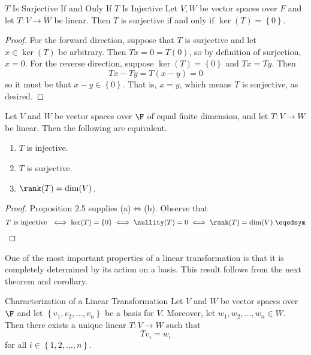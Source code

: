 \documentclass[linearalgebraI]{subfiles}
\begin{document}
    \begin{prop}{$T$ Is Surjective If and Only If $T$ Is Injective}
        Let $V, W$ be vector spaces over $F$ and let $T: V\to W$ be linear. Then $T$ is surjective if and only if $\ker(T) = \left\lbrace 0 \right\rbrace$.
    \end{prop}

    \begin{proof}
        For the forward direction, suppose that $T$ is surjective and let $x\in \ker(T)$ be arbitrary. Then $Tx = 0 = T(0)$, so by definition of surjection, $x=0$. For the reverse direction, suppose $\ker(T) = \left\lbrace 0 \right\rbrace$ and $Tx = Ty$. Then
        \begin{equation*}
            Tx - Ty = T(x-y) = 0
        \end{equation*}
        so it must be that $x-y\in \left\lbrace 0 \right\rbrace$. That is, $x = y$, which means $T$ is surjective, as desired.
    \end{proof}

    \clearpage
    \begin{prop}{}
        Let $V$ and $W$ be vector spaces over $\F$ of equal finite dimension, and let $T: V\to W$ be linear. Then the following are equivalent.
        \begin{enumerate}
            \item $T$ is injective.
            \item $T$ is surjective.
            \item $\rank(T)=\dim(V)$.
        \end{enumerate}
    \end{prop}

    \begin{proof}
        Proposition 2.5 supplies (a)$\iff$(b). Observe that
        \begin{equation*}
            T\text{ is injective } \iff \ker(T)=\left\lbrace 0 \right\rbrace \iff \nullity(T)=0\iff\rank(T)=\dim(V). \eqedsym
        \end{equation*}
    \end{proof}

    \begin{remark}
        One of the most important properties of a linear transformation is that it is completely determined by its action on a basis. This result follows from the next theorem and corollary.
    \end{remark}

    \begin{theorem}{Characterization of a Linear Transformation}
        Let $V$ and $W$ be vector spaces over $\F$ and let $\left\lbrace v_1, v_2, \ldots, v_n \right\rbrace$ be a basis for $V$. Moreover, let $w_1, w_2, \ldots, w_n\in W$. Then there exists a unique linear $T: V\to W$ such that
        \begin{equation*}
            Tv_i = w_i
        \end{equation*}
        for all $i\in\left\lbrace 1,2,\ldots,n \right\rbrace$.
    \end{theorem}
\end{document}
